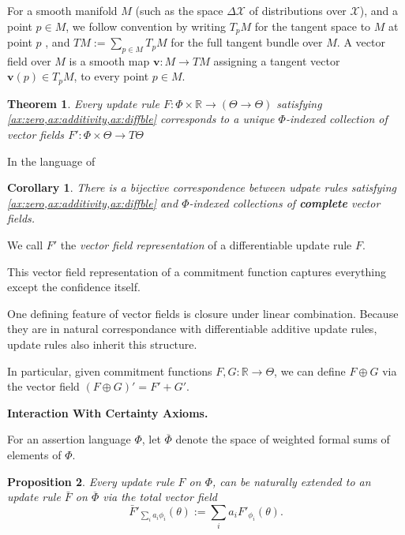 \documentclass{uai2023}
\let\parencite\citep
\theoremstyle{plain}
\newtheorem{theorem}{Theorem}
\newtheorem{coro}{Corollary}[theorem]
\newtheorem{prop}[theorem]{Proposition}
\theoremstyle{definition}
\newcommand{\mat}[1]{\mathbf{#1}}
\newcommand{\ext}[1]{\overline #1} \newcommand{\Unif}{\mathrm{Unif}}
\newcommand\cofunc{commitment function}
\newcommand\X{\mathcal X}
\begin{document}
\label{sec:vecrep}
For a smooth manifold $M$
(such as the space $\Delta \X$ of distributions over $\X$),
and a point $p \in M$, we follow convention by writing $T_p M$ for the tangent space to $M$ at point $p$ \parencite{lee2013smooth}, and $TM := \sum_{p \in M} T_p M$ for the full tangent bundle over $M$.
A vector field over $M$ is a smooth map $\mat v : M \to T M$ assigning a tangent vector $\mat v(p) \in T_p M$, to every point $p \in M$.


\begin{theorem}
Every update rule $F : \Phi \times \mathbb R \to (\Theta  \to \Theta)$
satisfying \cref{ax:zero,ax:additivity,ax:diffble} corresponds to a unique
$\Phi$-indexed collection of vector fields
    $F' : \Phi \times \Theta \to T\Theta$
\end{theorem}


In the language of 

\begin{coro}\label{thm:vecrep}
There is a bijective correspondence between udpate rules satisfying \cref{ax:zero,ax:additivity,ax:diffble} and $\Phi$-indexed collections of \textbf{complete} vector fields.
\end{coro}


We call $F'$ the \emph{vector field representation} of a differentiable update rule $F$.

This vector field representation of a commitment function captures everything except the confidence itself. 

One defining feature of vector fields is closure under linear
combination.  Because they are in natural correspondance with differentiable additive update rules, update rules also inherit this structure.

In particular, given \cofunc s $F, G : \mathbb R \to \Theta$, we can define
$F \oplus G$ via the vector field $(F \oplus G)' = F' + G'$.

\begin{wip}
\textbf{Interaction With Certainty Axioms.}

\end{wip}

\begin{defn}
For an assertion language $\Phi$, let $\ext\Phi$ denote
the space of weighted formal sums of elements of $\Phi$.
\end{defn}

\begin{prop}
Every  update rule $F$ on $\Phi$, can be naturally extended to an update rule
$\bar F$ on $\ext\Phi$
via the total vector field
\[
\bar F'_{\textstyle\sum_i a_i \phi_i} ( \theta ) := \sum_{i} a_i F'_{\phi_i}(\theta).
\]
\end{prop}
\end{document}
